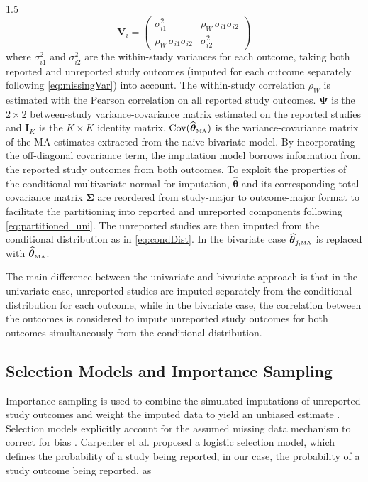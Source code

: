 \documentclass{article}
\begin{document}
\begin{spacing}{1.5}
\begin{equation*} 
\boldsymbol{V}_i = 
 \begin{pmatrix}
\sigma_{i1}^2 & \rho_W \, \sigma_{i1} \sigma_{i2} \\
\rho_W \, \sigma_{i1} \sigma_{i2} & \sigma_{i2}^2
\end{pmatrix} 
\end{equation*}
where $\sigma_{i1}^2$ and $\sigma_{i2}^2$ are the within-study variances for each outcome, taking both reported and unreported study outcomes (imputed for each outcome separately following \eqref{eq:missingVar}) into account. The within-study correlation $\rho_W$ is estimated with the Pearson correlation on all reported study outcomes. $\boldsymbol{\Psi}$ is the $2 \times 2$ between-study variance-covariance matrix estimated on the reported studies and $\boldsymbol{I}_K$ is the $K \times K$ identity matrix.
$\operatorname{Cov}(\widehat{\boldsymbol\theta}_{\tiny{\mbox{MA}}})$ is the variance-covariance matrix of the MA estimates extracted from the naive bivariate model. By incorporating the off-diagonal covariance term, the imputation model borrows information from the reported study outcomes from both outcomes. To exploit the properties of the conditional multivariate normal for imputation,  $\widehat{\boldsymbol{\theta}}$ and its corresponding total covariance matrix $\boldsymbol{\Sigma}$ are reordered from  study-major to outcome-major format to facilitate the partitioning into reported and unreported components following \eqref{eq:partitioned_uni}. The unreported studies are then imputed from the conditional distribution as in \eqref{eq:condDist}. In the bivariate case $\boldsymbol{\widehat\theta}_{j,\tiny{\mbox{MA}}}$ is replaced with $\boldsymbol{\widehat\theta}_{\tiny{\mbox{MA}}}$. 


The main difference between the univariate and bivariate approach is that in the univariate case, unreported studies are imputed separately from the conditional distribution for each outcome, while in the bivariate case, the correlation between the outcomes is considered to impute unreported study outcomes for both outcomes simultaneously from the conditional distribution.

\subsection{Selection Models and Importance Sampling} \label{Importance}
Importance sampling is used to combine the simulated imputations of unreported study outcomes and weight the imputed data to yield an unbiased estimate \cite{tabandeh2022review}. Selection models explicitly account for the assumed missing data mechanism to correct for bias \cite{cooper2019handbook, hedges1992modeling}.  Carpenter et al. \cite{carpenter2011assessing} proposed a logistic selection model, which defines the probability of a study being reported, in our case, the probability of a study outcome being reported, as


\end{spacing}
\end{document}
